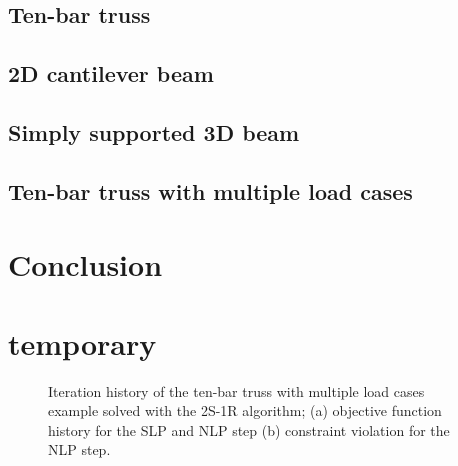 \subsection{Ten-bar truss}

\subsection{2D cantilever beam}

\subsection{Simply supported 3D beam}

\subsection{Ten-bar truss with multiple load cases}

\section{Conclusion}

\section{temporary}
\begin{figure}[]
    \hspace*{\fill}
    \hfill
    \hspace*{\fill}
    \caption{Iteration history of the ten-bar truss with multiple load cases example solved with the 2S-1R algorithm; (a) objective function history for the SLP and NLP step (b) constraint violation for the NLP step.}
    \label{fig:}
\end{figure}

